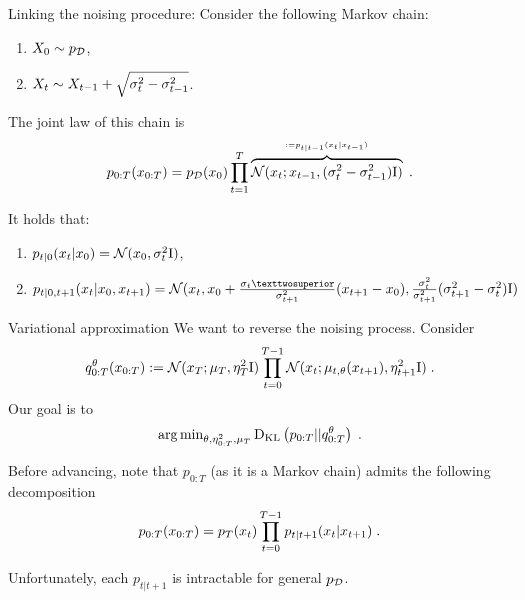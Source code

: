 \documentclass[10pt]{beamer}
\begin{document}
\begin{frame}{Linking the noising procedure: \cite{ho2020denoising}}
  Consider the following Markov chain:
  \begin{enumerate}
    \item $X_0 \sim p_{\mathcal{D}}$,
    \item $X_t \sim X_{t-1} + \sqrt{\sigma_t^2 - \sigma_{t-1}^2}$.
  \end{enumerate}

  \pause
  The joint law of this chain is
  \begin{equation}
     p_{0:T}(x_{0:T}) = p_{\mathcal{D}}(x_0) \prod_{t=1}^{T} \overbrace{\mathcal{N}(x_{t}; x_{t-1}, (\sigma_t^2 - \sigma_{t-1}^2) \mathrm{I})}^{^{:= p_{t|t-1}(x_t|x_{t-1})}} \;.
  \end{equation}
  
  \pause
  It holds that:
  \begin{enumerate}
    \item $p_{t|0}(x_{t} | x_0) = \mathcal{N}(x_0, \sigma_t^2 \mathrm{I})$,
    \item $p_{t|0, t+1}(\lstate_{t}| \lstate_0, \lstate_{t+1}) = \gauss(\lstate_{t}, \lstate_0 + \frac{\sigma_t²}{\sigma_{t+1}^2}(\lstate_{t+1} - \lstate_0), \frac{\sigma_t^2}{\sigma_{t+1}^2}(\sigma_{t+1}^2 - \sigma_{t}^2)\idm)$
  \end{enumerate}

\end{frame}
\begin{frame}{Variational approximation}
  We want to reverse the noising process. Consider
  \begin{equation}
    q_{0:T}^{\theta}(x_{0:T}) := \mathcal{N}(x_T; \mu_{T}, \eta_T^2 \mathrm{I}) \prod_{t=0}^{T-1} \mathcal{N}(x_{t}; \mu_{t, \theta}(x_{t+1}), \eta_{t+1}^2 \mathrm{I}) \;.
  \end{equation}
  \pause
  Our goal is to
  \begin{equation}
    {\arg\min}_{\theta, \eta_{0:T}^2, \mu_{T}} \operatorname{D}_{\operatorname{KL}}\left(p_{0:T}||q_{0:T}^{\theta}\right) \;.
  \end{equation}

  \pause
  Before advancing, note that $p_{0:T}$ (as it is a Markov chain) admits the following decomposition
  $$p_{0:T}(x_{0:T}) = p_T(x_t) \prod_{t=0}^{T-1} p_{t|t+1}(x_{t} | x_{t+1}) \;.$$

  Unfortunately, each $p_{t|t+1}$ is intractable for general $p_{\mathcal{D}}$.
\end{frame}
\end{document}
